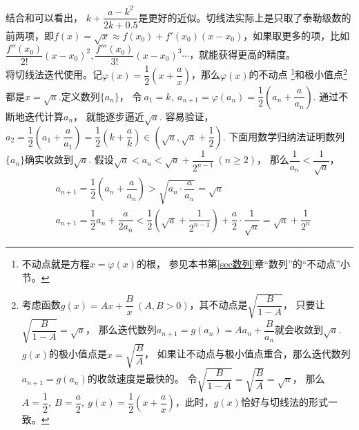 \begin{itemize}[leftmargin=\inteval{\myitemleftmargin}pt,itemsep=
   \inteval{\myitemitempsep}pt,topsep=\inteval{\myitemtopsep}pt]
结合和可以看出，
$ k+\dfrac{a-k^2}{2k+0.5} $是更好的近似。切线法实际上是只取了泰勒级数的前两项，即$ f(x)=\sqrt{x} \approx f(x_0)+f'(x_0)(x-x_0) $，如果取更多的项，比如$ \dfrac{f''(x_0)}{2!}(x-x_0)^2,
\dfrac{f'''(x_0)}{3!}(x-x_0)^3\cdots $，就能获得更高的精度。\\
将切线法迭代使用。记$ \varphi(x)=\dfrac{1}{2}
\left(x+\dfrac{a}{x}\right) $，那么$ \varphi(x) $的不动点
\footnote{不动点就是方程$ x=\varphi(x) $的根，
参见本书第\ref{sec数列}章“数列”的“不动点”小节。}和极小值点\footnote{
考虑函数$ g(x)=Ax+\dfrac{B}{x}\ (A,B>0) $，其不动点是$ \sqrt{\dfrac{B}{1-A}} $，
只要让$ \sqrt{\dfrac{B}{1-A}}=\sqrt{a} $，
那么迭代数列$ a_{n+1}=g(a_n)=Aa_n+\dfrac{B}{a_n} $就会收敛到$ \sqrt{a} $.
$ g(x) $的极小值点是$ x=\sqrt{\dfrac{B}{A}} $，
如果让不动点与极小值点重合，那么迭代数列$ a_{n+1}=g(a_n) $的收敛速度是最快的。
令$ \sqrt{\dfrac{B}{1-A}}=\sqrt{\dfrac{B}{A}}=\sqrt{a} $，
那么$ A=\dfrac{1}{2},\ B=\dfrac{a}{2},\ g(x)=\dfrac{1}{2}\left(
x+\dfrac{a}{x}\right) $，此时，$ g(x) $恰好与切线法的形式一致。}
都是$ x=\sqrt{a} $.定义数列$ \{a_n\} $，
令$\ a_1=k,\ a_{n+1}=\varphi(a_n)=\dfrac{1}{2}\left(
a_n+\dfrac{a}{a_n}\right) $. 通过不断地迭代计算$ a_n $，
就能逐步逼近$ \sqrt{a} $.
容易验证，$ a_{2}=\dfrac{1}{2}\left(a_1+\dfrac{a}{a_1}\right)
=\dfrac{1}{2}\left(k+\dfrac{a}{k}\right)
\in (\sqrt{a},\sqrt{a}+\dfrac{1}{2}) $.
下面用数学归纳法证明数列$ \{a_n\} $确实收敛到$ \sqrt{a} $.
假设$ \sqrt{a}<a_n<\sqrt{a}+\dfrac{1}{2^{n-1}}\ (n\geq 2) $，
那么$ \dfrac{1}{a_n} < \dfrac{1}{\sqrt{a}} $，
\begin{align*}
    & a_{n+1}=\dfrac{1}{2}\left(a_n+\dfrac{a}{a_n}\right)>
    \sqrt{a_n\cdot\dfrac{a}{a_n}}=\sqrt{a} \\ 
    & a_{n+1}=\dfrac{1}{2}a_n+\dfrac{a}{2a_n}<\dfrac{1}{2}
    \left(\sqrt{a}+\dfrac{1}{2^{n-1}} \right)+\dfrac{a}{2}\cdot \dfrac{1}{\sqrt{a}}=\sqrt{a}+\dfrac{1}{2^n}

\end{align*}
\end{itemize}

